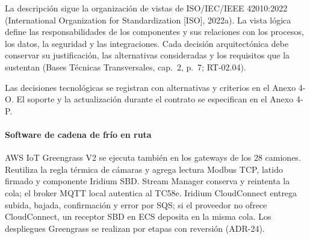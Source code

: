 La descripción sigue la organización de vistas de ISO/IEC/IEEE 42010:2022 (International Organization for Standardization [ISO], 2022a). La vista lógica define las responsabilidades de los componentes y sus relaciones con los procesos, los datos, la seguridad y las integraciones. Cada decisión arquitectónica debe conservar su justificación, las alternativas consideradas y los requisitos que la sustentan (Bases Técnicas Transversales, cap.~2, p.~7; RT-02.04).

Las decisiones tecnológicas se registran con alternativas y criterios en el Anexo 4-O. El soporte y la actualización durante el contrato se especifican en el Anexo 4-P.

\paragraph{Software de cadena de frío en ruta}
AWS IoT Greengrass V2 se ejecuta también en los gateways de los 28 camiones. Reutiliza la regla térmica de cámaras y agrega lectura Modbus TCP, latido firmado y componente Iridium SBD. Stream Manager conserva y reintenta la cola; el broker MQTT local autentica al TC58e. Iridium CloudConnect entrega subida, bajada, confirmación y error por SQS; si el proveedor no ofrece CloudConnect, un receptor SBD en ECS deposita en la misma cola. Los despliegues Greengrass se realizan por etapas con reversión (ADR-24).
